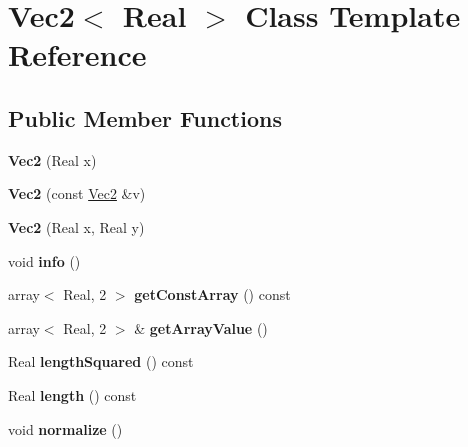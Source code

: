 \hypertarget{classVec2}{\section{Vec2$<$ Real $>$ Class Template Reference}
\label{classVec2}
}
\subsection*{Public Member Functions}
\begin{DoxyCompactItemize}
\item 
\hypertarget{classVec2_a74bcfb557d074d5ba62bc43c401ae02a}{{\bfseries Vec2} (Real x)}\label{classVec2_a74bcfb557d074d5ba62bc43c401ae02a}

\item 
\hypertarget{classVec2_a8816e6f138fc2fa317029eecf92bf8d4}{{\bfseries Vec2} (const \hyperlink{classVec2}{Vec2} \&v)}\label{classVec2_a8816e6f138fc2fa317029eecf92bf8d4}

\item 
\hypertarget{classVec2_a16e9459f963d59d25009593a593e3639}{{\bfseries Vec2} (Real x, Real y)}\label{classVec2_a16e9459f963d59d25009593a593e3639}

\item 
\hypertarget{classVec2_abc8bb87a64a835f9ce0c274e87604bbd}{void {\bfseries info} ()}\label{classVec2_abc8bb87a64a835f9ce0c274e87604bbd}

\item 
\hypertarget{classVec2_a018e72b6cd2bb6bb210d7467a9dc90f5}{array$<$ Real, 2 $>$ {\bfseries get\+Const\+Array} () const }\label{classVec2_a018e72b6cd2bb6bb210d7467a9dc90f5}

\item 
\hypertarget{classVec2_ac2142b7b5ddfd016a82b06d5b047c672}{array$<$ Real, 2 $>$ \& {\bfseries get\+Array\+Value} ()}\label{classVec2_ac2142b7b5ddfd016a82b06d5b047c672}

\item 
\hypertarget{classVec2_a4345d1b44f2ee734c46569ea6147d11d}{Real {\bfseries length\+Squared} () const }\label{classVec2_a4345d1b44f2ee734c46569ea6147d11d}

\item 
\hypertarget{classVec2_af00f3678d6f10ed5365de36a81d97ed0}{Real {\bfseries length} () const }\label{classVec2_af00f3678d6f10ed5365de36a81d97ed0}

\item 
\hypertarget{classVec2_a58ee0b04b3942f902fcc45235f68e266}{void {\bfseries normalize} ()}\label{classVec2_a58ee0b04b3942f902fcc45235f68e266}


\end{DoxyCompactItemize}
